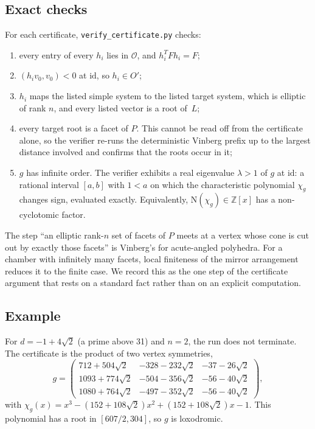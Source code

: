 \documentclass[11pt]{amsart}
\theoremstyle{definition}
\newcommand{\Z}{\mathbb{Z}}
\newcommand{\OK}{\mathcal{O}}
\newcommand{\id}{\mathrm{id}}
\newcommand{\N}{\mathrm{N}}
\begin{document}
\subsection{Exact checks}
For each certificate, \texttt{verify\_certificate.py} checks:
\begin{enumerate}
\item every entry of every $h_i$ lies in $\OK$, and $h_i^TFh_i=F$;
\item $(h_iv_0,v_0)<0$ at $\id$, so $h_i\in O'$;
\item $h_i$ maps the listed simple system to the listed target system, which is elliptic of
  rank $n$, and every listed vector is a root of~$L$;
\item every target root is a facet of $P$. This cannot be read off from the certificate
  alone, so the verifier re-runs the deterministic Vinberg prefix up to the largest distance
  involved and confirms that the roots occur in it;
\item $g$ has infinite order. The verifier exhibits a real eigenvalue $\lambda>1$ of $g$ at
  $\id$: a rational interval $[a,b]$ with $1<a$ on which the characteristic polynomial
  $\chi_g$ changes sign, evaluated exactly. Equivalently, $\N(\chi_g)\in\Z[x]$ has a
  non-cyclotomic factor.
\end{enumerate}
The step ``an elliptic rank-$n$ set of facets of $P$ meets at a vertex whose cone is cut out
by exactly those facets'' is Vinberg's for acute-angled polyhedra. For a chamber with
infinitely many facets, local finiteness of the mirror arrangement reduces it to the finite
case. We record this as the one step of the certificate argument that rests on a standard
fact rather than on an explicit computation.

\subsection{Example}
For $d=-1+4\sqrt2$ (a prime above 31) and $n=2$, the run does not terminate. The certificate
is the product of two vertex symmetries,
\[
 g=\begin{pmatrix}
 712+504\sqrt2 & -328-232\sqrt2 & -37-26\sqrt2\\
 1093+774\sqrt2 & -504-356\sqrt2 & -56-40\sqrt2\\
 1080+764\sqrt2 & -497-352\sqrt2 & -56-40\sqrt2\end{pmatrix},
\]
with $\chi_g(x)=x^3-(152+108\sqrt2)x^2+(152+108\sqrt2)x-1$. This polynomial has a root in
$[607/2,304]$, so $g$ is loxodromic.
\end{document}

